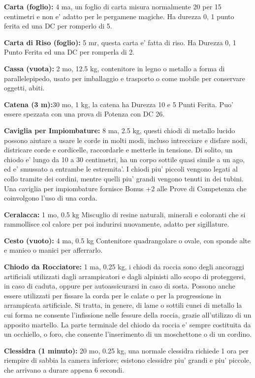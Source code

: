 \documentclass[a4paper,11pt,twoside,openany]{book}
\begin{document}
{\textbf{Carta (foglio):} 4 ma, un foglio di carta misura normalmente 20 per 15 centimetri e non e' adatto per le pergamene magiche. Ha durezza 0, 1 punto ferita ed una DC per romperlo di 5.

\textbf{Carta di Riso (foglio):} 5 mr, questa carta e' fatta di riso. Ha Durezza 0, 1 Punto Ferita ed una DC per romperla di 2.

\textbf{Cassa (vuota):} 2 mo, 12.5 kg, contenitore in legno o metallo a forma di parallelepipedo, usato per imballaggio e trasporto o come mobile per conservare oggetti, abiti. 

\textbf{Catena (3 m):}30 mo, 1 kg, la catena ha Durezza 10 e 5 Punti Ferita. Puo' essere spezzata con
una prova di Potenza con DC 26.

\textbf{Caviglia per Impiombature:} 8 ma, 2.5 kg, questi chiodi di metallo lucido possono aiutare a usare le corde in molti modi, incluso intrecciare e disfare nodi, districare corde e cordicelle, raccordarle e metterle in tensione. Di solito, un chiodo e' lungo da 10 a 30 centimetri, ha un corpo sottile quasi simile a un ago, ed e' smussato a entrambe le estremita'. I chiodi piu' piccoli vengono legati al collo tramite dei cordini, mentre quelli piu' grandi vengono tenuti in dei tubini. Una caviglia per impiombature fornisce Bonus +2 alle Prove di Competenza che coinvolgono l'uso di una corda. 

\textbf{Ceralacca:} 1 mo, 0.5 kg Miscuglio di resine naturali, minerali e coloranti che si rammollisce col calore per poi indurirsi nuovamente, adatto per sigillature.

\textbf{Cesto (vuoto):} 4 ma, 0.5 kg Contenitore quadrangolare o ovale, con sponde alte e manico o manici per afferrarlo.

\textbf{Chiodo da Rocciatore:} 1 ma, 0.25 kg, i chiodi da roccia sono degli ancoraggi artificiali utilizzati dagli arrampicatori e dagli alpinisti allo scopo di proteggersi, in caso di caduta, oppure per autoassicurarsi in caso di sosta. Possono anche essere utilizzati per fissare la corda per le calate o per la progressione in arrampicata artificiale. Si tratta, in genere, di lame o sottili cunei di metallo la cui forma ne consente l'infissione nelle fessure della roccia, grazie all'utilizzo di un apposito martello. La parte terminale del chiodo da roccia e' sempre costituita da un occhiello, o foro, che consente l'inserimento di un moschettone o di un cordino.

\textbf{Clessidra (1 minuto):} 20 mo, 0.25 kg, una normale clessidra richiede 1 ora per riempire di sabbia la camera inferiore; esistono clessidre piu' grandi e piu' piccole, che arrivano a durare appena 6
secondi.

}
\end{document}
